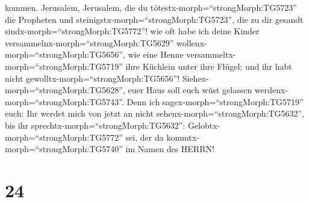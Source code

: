 kommen.  Jerusalem, Jerusalem, die du
tötestx-morph=``strongMorph:TG5723'' die Propheten und
steinigstx-morph=``strongMorph:TG5723'', die zu dir gesandt
sindx-morph=``strongMorph:TG5772''! wie oft habe ich deine Kinder
versammelnx-morph=``strongMorph:TG5629''
wollenx-morph=``strongMorph:TG5656'', wie eine Henne
versammeltx-morph=``strongMorph:TG5719'' ihre Küchlein unter ihre
Flügel; und ihr habt nicht gewolltx-morph=``strongMorph:TG5656''!
 Siehex-morph=``strongMorph:TG5628'', euer Haus soll euch
wüst gelassen werdenx-morph=``strongMorph:TG5743''.  Denn
ich sagex-morph=``strongMorph:TG5719'' euch: Ihr werdet mich von jetzt
an nicht sehenx-morph=``strongMorph:TG5632'', bis ihr
sprechtx-morph=``strongMorph:TG5632'':
Gelobtx-morph=``strongMorph:TG5772'' sei, der da
kommtx-morph=``strongMorph:TG5740'' im Namen des HERRN!

\hypertarget{section-23}{%
\section{24}\label{section-23}}

